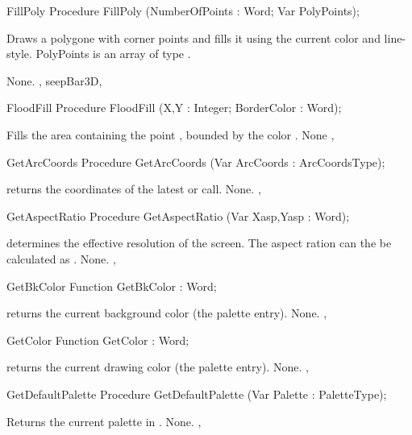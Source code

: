 \begin{procedure}{FillPoly}
\Declaration
Procedure FillPoly (NumberOfPoints : Word; Var PolyPoints);

\Description

Draws a polygone with  corner points and fills it
using the current color and line-style. 
PolyPoints is an array of type .

\Errors
None.
\SeeAlso
{}, seep{Bar3D}, 
\end{procedure}
\begin{procedure}{FloodFill}
\Declaration
Procedure FloodFill (X,Y : Integer; BorderColor : Word);

\Description

Fills the area containing the point , bounded by the color
.
\Errors
None
\SeeAlso
{}, 
\end{procedure}
\begin{procedure}{GetArcCoords}
\Declaration
Procedure GetArcCoords (Var ArcCoords : ArcCoordsType);

\Description
{} returns the coordinates of the latest  or
 call.
\Errors
None.
\SeeAlso
{}, 
\end{procedure}
\begin{procedure}{GetAspectRatio}
\Declaration
Procedure GetAspectRatio (Var Xasp,Yasp : Word);

\Description
{} determines the effective resolution of the screen. The aspect ration can
the be calculated as .
\Errors
None.
\SeeAlso
{},
\end{procedure}
\begin{function}{GetBkColor}
\Declaration
Function GetBkColor  : Word;

\Description
{} returns the current background color (the palette
entry).
\Errors
None.
\SeeAlso
{},
\end{function}
\begin{function}{GetColor}
\Declaration
Function GetColor  : Word;

\Description
{} returns the current drawing color (the palette
entry).
\Errors
None.
\SeeAlso
{},
\end{function}
\begin{procedure}{GetDefaultPalette}
\Declaration
Procedure GetDefaultPalette (Var Palette : PaletteType);

\Description
Returns the
current palette in .
\Errors
None.
\SeeAlso
{}, 
\end{procedure}

